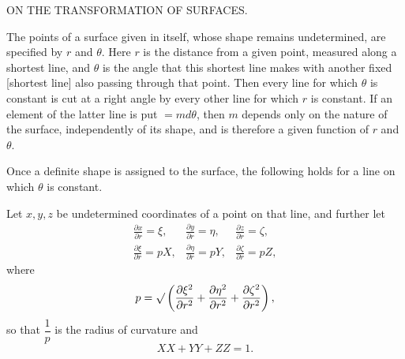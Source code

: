 \clearpage
{}
\begin{center}\large ON THE TRANSFORMATION OF SURFACES.\end{center}
\noindent\hspace*{1.2em}The points of a surface given in itself, whose shape remains undetermined, are specified by $r$ and $\theta$. Here $r$ is the distance from a given point, measured along a shortest line, and $\theta$ is the angle that this shortest line makes with another fixed [shortest line] also passing through that point. Then every line for which $\theta$ is constant is cut at a right angle by every other line for which $r$ is constant. If an element of the latter line is put $=md\theta$, then $m$ depends only on the nature of the surface, independently of its shape, and is therefore a given function of $r$ and $\theta$.

Once a definite shape is assigned to the surface, the following holds for a line on which $\theta$ is constant.

Let $x,y,z$ be undetermined coordinates of a point on that line, and further let
\[
\begin{array}{lll}
\displaystyle\frac{\partial x}{\partial r}=\xi,&\displaystyle\frac{\partial y}{\partial r}=\eta,&\displaystyle\frac{\partial z}{\partial r}=\zeta,\\[6pt]
\displaystyle\frac{\partial\xi}{\partial r}=pX,&\displaystyle\frac{\partial\eta}{\partial r}=pY,&\displaystyle\frac{\partial\zeta}{\partial r}=pZ,
\end{array}
\]
\noindent where
\[
p=\mathord{\surd}\left(\frac{\partial\xi^2}{\partial r^2}+\frac{\partial\eta^2}{\partial r^2}+\frac{\partial\zeta^2}{\partial r^2}\right),
\]
\noindent so that $\dfrac1p$ is the radius of curvature and
\[
XX+YY+ZZ=1.
\]
